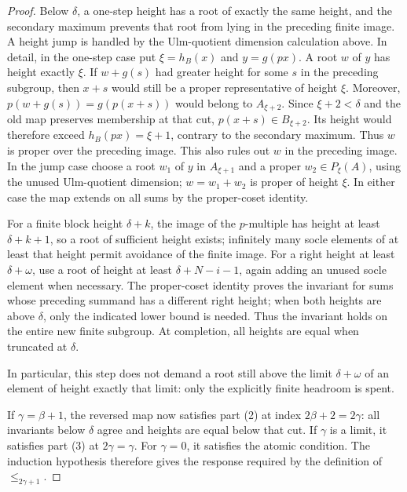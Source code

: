 \documentclass[11pt]{article}
\begin{document}
\begin{proof}
Below $\delta$, a one-step height has a root of exactly the same
height, and the secondary maximum prevents that root from lying
in the preceding finite image. A height jump is handled by the
Ulm-quotient dimension calculation above. In detail, in the one-step
case put $\xi=h_B(x)$ and $y=g(px)$. A root $w$ of $y$ has
height exactly $\xi$. If $w+g(s)$ had greater height for some
$s$ in the preceding subgroup, then $x+s$ would still be a proper
representative of height $\xi$. Moreover,
$p(w+g(s))=g(p(x+s))$ would belong to $A_{\xi+2}$.
Since $\xi+2<\delta$ and the old map preserves membership at
that cut, $p(x+s)\in B_{\xi+2}$. Its height would therefore
exceed $h_B(px)=\xi+1$, contrary to the secondary maximum.
Thus $w$ is proper over the preceding image. This also rules out
$w$ in the preceding image. In the jump case choose a root $w_1$
of $y$ in $A_{\xi+1}$ and a proper $w_2\in P_\xi(A)$, using
the unused Ulm-quotient dimension; $w=w_1+w_2$ is proper of height
$\xi$. In either case the map extends on all sums by the
proper-coset identity.

For a finite block height
$\delta+k$, the image of the $p$-multiple has height at least
$\delta+k+1$, so a root of sufficient height exists; infinitely
many socle elements of at least that height permit avoidance of the finite
image. For a right height at least $\delta+\omega$, use a root
of height at least $\delta+N-i-1$, again adding an unused socle
element when necessary. The proper-coset identity proves the
invariant for sums whose preceding summand has a different
right height; when both heights are above $\delta$, only the
indicated lower bound is needed. Thus the invariant holds on the
entire new finite subgroup. At completion, all heights are equal
when truncated at $\delta$.

In particular, this step does not demand a root still above the
limit $\delta+\omega$ of an element of height exactly that limit:
only the explicitly finite headroom is spent.

If $\gamma=\beta+1$, the reversed map now satisfies part (2) at
index $2\beta+2=2\gamma$: all invariants below $\delta$ agree and
heights are equal below that cut. If $\gamma$ is a limit, it
satisfies part (3) at $2\gamma=\gamma$. For $\gamma=0$, it
satisfies the atomic condition. The induction hypothesis therefore
gives the response required by the definition of $\le_{2\gamma+1}$.


\end{proof}
\end{document}
